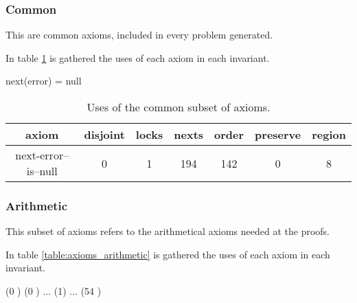 


\subsubsection{Common}
	This are common axioms, included in every \spass problem generated. 

	In table \ref{table:axioms_common} is gathered the uses of each axiom in each invariant.


	\begin{axiomdescription}
		\label{ax::next_error__is__null}
		\begin{formula}
			next(error) = null
		\end{formula}
	\end{axiomdescription}

	\begin{table}[hbtp]
		\centering
		\begin{tabular}{c|cccccc}
			axiom & disjoint & locks & nexts & order & preserve & region 
			\\\hline
			next-error--is--null & 0 & 1 & 194 & 142 & 0 & 8 
			\\
		\end{tabular}
		\label{table:axioms_common}
		\caption{Uses of the common subset of axioms.}
	\end{table}



\subsubsection{Arithmetic}
	
	This subset of axioms refers to the arithmetical axioms needed at the proofs.
	
	In table \ref{table:axioms_arithmetic} is gathered the uses of each axiom in each invariant.

	\begin{axiomdescription}
		\label{ax::nums_are_different}
		\begin{formula}
			(0 ) \andcond (0 ) \andcond ... \andcond (1) \andcond ... (54 )
		\end{formula}
	\end{axiomdescription}



